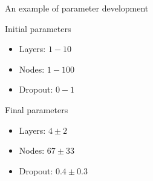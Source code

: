 \begin{frame}{An example of parameter development}
     \begin{block}{Initial parameters}
         \begin{itemize}
             \item Layers: $1-10$
             \item Nodes: $1-100$
             \item Dropout: $0-1$
         \end{itemize}
     \end{block}
     \begin{block}{Final parameters}
         \begin{itemize}
             \item Layers: $4\pm2$
             \item Nodes: $67\pm33$
             \item Dropout: $0.4\pm0.3$
         \end{itemize}
     \end{block}
\end{frame}

